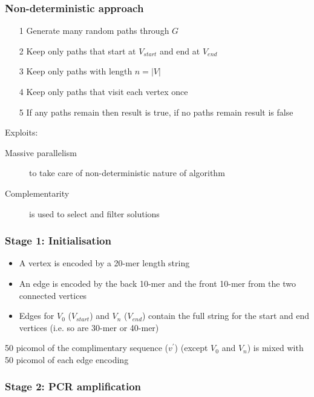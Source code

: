 \documentclass[a4paper]{article}
\begin{document}
\subsubsection{Non-deterministic approach}

\begin{enumerate}
  \item[1] Generate many random paths through $G$
  \item[2] Keep only paths that start at $V_{start}$ and end at $V_{end}$
  \item[3] Keep only paths with length $n = |V|$
  \item[4] Keep only paths that visit each vertex once
  \item[5] If any paths remain then result is true, if no paths remain result is
           false
\end{enumerate}

Exploits:

\begin{description}
  \item[Massive parallelism] to take care of non-deterministic nature of
                             algorithm
  \item[Complementarity] is used to select and filter solutions
\end{description}

\subsubsection{Stage 1: Initialisation}


\begin{itemize}
  \item A vertex is encoded by a 20-mer length string
  \item An edge is encoded by the back 10-mer and the front 10-mer from the two
        connected vertices
  \item Edges for $V_{0}$ ($V_{start}$) and $V_{n}$ ($V_{end}$) contain the full
        string for the start and end vertices (i.e. so are 30-mer or 40-mer)
\end{itemize}


50 picomol of the complimentary sequence ($v^{\prime}$) (except $V_{0}$ and
$V_{n}$) is mixed with 50 picomol of each edge encoding

\subsubsection{Stage 2: PCR amplification}
\end{document}
